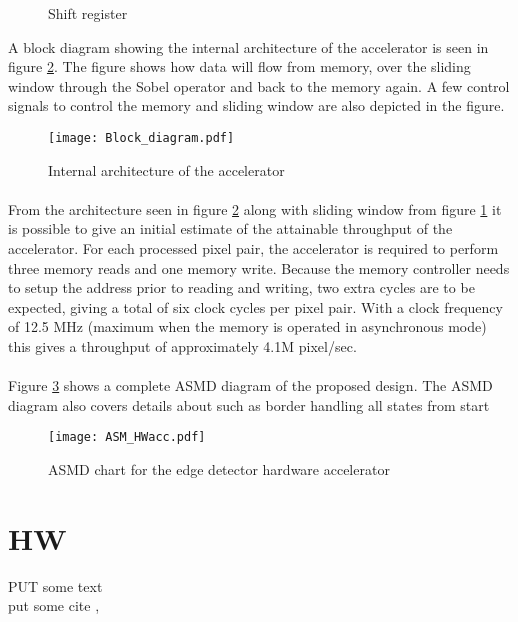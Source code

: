 \begin{figure}[H]
	\centering
	\caption{Shift register}
	\label{fig:shift_register}
\end{figure}

A block diagram showing the internal architecture of the accelerator is seen in figure \ref{fig:AccBlockDiagram}. The figure shows how data will flow from memory, over the sliding window through the Sobel operator and back to the memory again. A few control signals to control the memory and sliding window are also depicted in the figure. 

\begin{figure}[H]
	\centering
	\texttt{[image: Block\_diagram.pdf]}
	\caption{Internal architecture of the accelerator}
	\label{fig:AccBlockDiagram}
\end{figure}

\paragraph*{}
From the architecture seen in figure \ref{fig:AccBlockDiagram} along with sliding window from figure \ref{fig:shift_register} it is possible to give an initial estimate of the attainable throughput of the accelerator. For each processed pixel pair, the accelerator is required to perform three memory reads and one memory write. Because the memory controller needs to setup the address prior to reading and writing, two extra cycles are to be expected, giving a total of six clock cycles per pixel pair.
With a clock frequency of 12.5 MHz (maximum when the memory is operated in asynchronous mode) this gives a throughput of approximately 4.1M pixel/sec.

\paragraph*{}
Figure \ref{fig:ASM_HW} shows a complete ASMD diagram of the proposed design. The ASMD diagram also covers details about such as border handling all states from start 

\begin{figure}[H]
	\centering
	\texttt{[image: ASM\_HWacc.pdf]}
	\caption{ASMD chart for the edge detector hardware accelerator}
	\label{fig:ASM_HW}
\end{figure}

\section{HW}
\label{sec:hw}
PUT some text\\
put some cite \cite[p.11~eq.2.6]{Book}, \cite[p.11~eq.2.6]{Note}